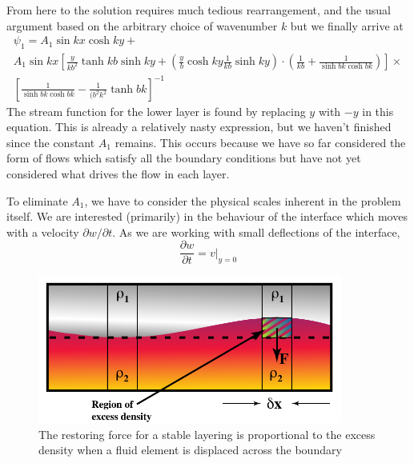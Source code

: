 \documentclass[10pt]{article}
\begin{document}
	From here to the solution requires much tedious rearrangement, and the usual argument
	based on the arbitrary choice of wavenumber $k$ but we finally arrive at	
		\begin{multline}
			\psi_1 = A_1 \sin kx \cosh ky + \\
							A_1 \sin kx \left[ 	
								\frac{y}{k b^2} \tanh kb \sinh ky + 
										\left( \frac{y}{b} \cosh ky    \frac{1}{kb} \sinh ky \right) \cdot 
										\left( \frac{1}{kb} + 
										\frac{1}{\sinh bk \cosh bk} \right) \right] \times \\
							\left[ \frac{1}{\sinh bk \cosh bk} - \frac{1}{(b^2k^2} \tanh bk \right] ^{-1} 	
			\label{eq:raytays1}				
		\end{multline}	
	The stream function for the lower layer is found by replacing $y$ with $-y$ in this 
	equation.	 This is already a relatively nasty expression, but we haven't finished since
	the constant $A_1$ remains. This occurs because we have so far considered the form
	of flows which satisfy all the boundary conditions but have not yet considered
	what drives the flow in each layer.
	
	To eliminate $A_1$, we have to consider the physical scales inherent in the 
	problem itself. We are interested (primarily) in the behaviour of the interface
	which moves with a velocity $\partial w / \partial t$. As we are working with
	small deflections of the interface, 
		\begin{equation}
			\frac{\partial w}{\partial t} = \left. v \right|_{y=0}
		\end{equation}
	
		\begin{figure}[h]
			\begin{center}
				\includegraphics[width=100mm]{Diagrams/diapir2}
				\caption[]{
					The restoring force for a stable layering is proportional to
					the excess density when a fluid element is displaced across
					the boundary}
				\label{fig:raytay2}
			\end{center}	
		\end{figure}
	
\end{document}
